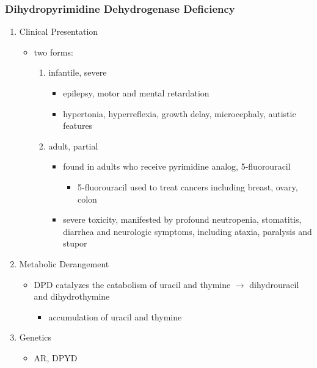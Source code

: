 \documentclass{scrartcl}
\begin{document}
\subsubsection{Dihydropyrimidine Dehydrogenase Deficiency}
\label{sec:org5051d9b}
\begin{enumerate}
\item Clinical Presentation
\label{sec:org5a65ecd}
\begin{itemize}
\item two forms:
\begin{enumerate}
\item infantile, severe
\begin{itemize}
\item epilepsy, motor and mental retardation
\item hypertonia, hyperreflexia, growth delay, microcephaly, autistic features
\end{itemize}
\item adult, partial
\begin{itemize}
\item found in adults who receive pyrimidine analog, 5-fluorouracil
\begin{itemize}
\item 5-fluorouracil used to treat cancers including breast, ovary, colon
\end{itemize}
\item severe toxicity, manifested by profound neutropenia, stomatitis,
diarrhea and neurologic symptoms, including ataxia, paralysis
and stupor
\end{itemize}
\end{enumerate}
\end{itemize}

\item Metabolic Derangement
\label{sec:orgbe2cbd9}
\begin{itemize}
\item DPD catalyzes the catabolism of uracil and thymine \(\to\) dihydrouracil
and dihydrothymine
\begin{itemize}
\item accumulation of uracil and thymine
\end{itemize}
\end{itemize}

\item Genetics
\label{sec:org8257f4f}
\begin{itemize}
\item AR, DPYD
\end{itemize}


\end{enumerate}
\end{document}
